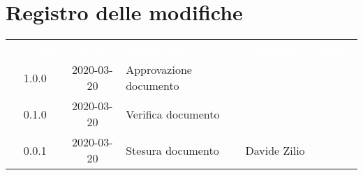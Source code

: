 \section*{Registro delle modifiche}
{
	\centering
	\begin{longtable}{ c c  C{4cm}  c  c }
		\textcolor{white}{\textbf{Versione}} & \textcolor{white}{\textbf{Data}} & \textcolor{white}{\textbf{Descrizione}} & \textcolor{white}{\textbf{Nominativo}} & \textcolor{white}{\textbf{Ruolo}}\\		
		1.0.0 & 2020-03-20 & Approvazione documento &  &\RdP{}\\		
		0.1.0 & 2020-03-20 & Verifica documento &  &\ver{}\\		
		0.0.1 & 2020-03-20 & Stesura documento & Davide Zilio &\reda{}\\		
		
	\end{longtable}

}